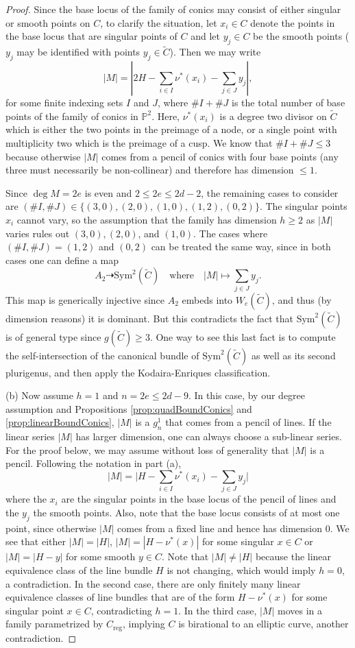 \documentclass[fontsize=11pt,reqno]{amsart}
\theoremstyle{definition}
\theoremstyle{remark}
\newcommand{\tC}{\widetilde{C}}
\renewcommand{\P}{\mathbb{P}}
\newcommand{\Sym}{\mathrm{Sym}}
\begin{document}
\begin{proof}
Since the base locus of the family of conics may consist of either singular or smooth points on $C$, to clarify the situation, let $x_{i} \in C$ denote the points in the base locus that are singular points of $C$ and let $y_{j} \in C$ be the smooth points ($y_{j}$ may be identified with points $y_{j} \in \tC$). Then we may write
    \[ |M| = \left| 2H - \sum_{i \in I} \nu^{\ast}(x_{i}) - \sum_{j \in J} y_{j} \right|, \]
for some finite indexing sets $I$ and $J$, where $\# I + \#J$ is the total number of base points of the family of conics in $\P^{2}$. Here, $\nu^{\ast}(x_{i})$ is a degree two divisor on $\tC$ which is either the two points in the preimage of a node, or a single point with multiplicity two which is the preimage of a cusp. We know that $\# I + \#J \leq 3$ because otherwise $|M|$ comes from a pencil of conics with four base points (any three must necessarily be non-collinear) and therefore has dimension $\leq 1$.

Since $\deg M = 2e$ is even and $2 \leq 2e \leq 2d-2$, the remaining cases to consider are $(\#I, \#J) \in \{ (3, 0), (2, 0), (1, 0), (1, 2), (0, 2) \}$. The singular points $x_{i}$ cannot vary, so the assumption that the family has dimension $h \geq 2$ as $|M|$ varies rules out $(3, 0), (2, 0)$, and $(1, 0)$. The cases where $(\#I, \#J) = (1,2)$ and $(0,2)$ can be treated the same way, since in both cases one can define a map
    \[ A_{2} \dashrightarrow \Sym^{2}(\tC) \quad \text{where} \quad |M| \mapsto \sum_{j \in J} y_{j}. \]
This map is generically injective since $A_{2}$ embeds into $W_{e}(\tC)$, and thus (by dimension reasons) it is dominant. But this contradicts the fact that $\Sym^{2}(\tC)$ is of general type since $g(\tC) \geq 3$. One way to see this last fact is to compute the self-intersection of the canonical bundle of $\Sym^{2}(\tC)$ as well as its second plurigenus, and then apply the Kodaira-Enriques classification.

(b) Now assume $h=1$ and $n=2e\leq 2d-9$. In this case, by our degree assumption and Propositions \ref{prop:quadBoundConics} and \ref{prop:linearBoundConics}, $|M|$ is a $g^1_n$ that comes from a pencil of lines. If the linear series $|M|$ has larger dimension, one can always choose a sub-linear series. For the proof below, we may assume without loss of generality that $|M|$ is a pencil. Following the notation in part (a),
\[ |M|=\Big|H-\sum_{i\in I} \nu^*(x_i)-\sum_{j \in J} y_j\Big| \]
where the $x_i$ are the singular points in the base locus of the pencil of lines and the $y_j$ the smooth points. Also, note that the base locus consists of at most one point, since otherwise $|M|$ comes from a fixed line and hence has dimension $0$. We see that either $|M|=|H|$, $|M|=|H-\nu^*(x)|$ for some singular $x \in C$ or $|M|=|H-y|$ for some smooth $y \in C$. Note that $|M| \not= |H|$ because the linear equivalence class of the line bundle $H$ is not changing, which would imply $h = 0$, a contradiction. In the second case, there are only finitely many linear equivalence classes of line bundles that are of the form $H-\nu^*(x)$ for some singular point $x \in C$, contradicting $h=1$. In the third case, $|M|$ moves in a family parametrized by $C_{\mathrm{reg}}$, implying $C$ is birational to an elliptic curve, another contradiction.


\end{proof}
\end{document}
